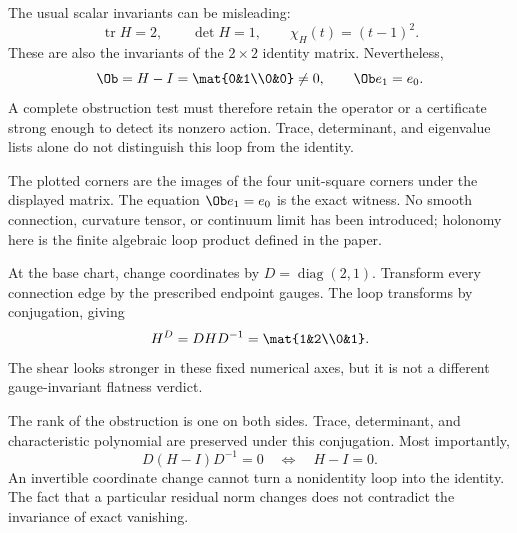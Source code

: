 
The usual scalar invariants can be misleading:
\[
\operatorname{tr}H=2,\qquad \det H=1,\qquad
\chi_H(t)=(t-1)^2.
\]
These are also the invariants of the $2\times2$ identity matrix. Nevertheless,
\[
\Ob=H-I=\mat{0&1\\0&0}\ne0,
\qquad \Ob e_1=e_0.
\]
A complete obstruction test must therefore retain the operator or a certificate strong enough to detect its nonzero action. Trace, determinant, and eigenvalue lists alone do not distinguish this loop from the identity.

The plotted corners are the images of the four unit-square corners under the displayed matrix. The equation $\Ob e_1=e_0$ is the exact witness. No smooth connection, curvature tensor, or continuum limit has been introduced; holonomy here is the finite algebraic loop product defined in the paper.


At the base chart, change coordinates by $D=\operatorname{diag}(2,1)$. Transform every connection edge by the prescribed endpoint gauges. The loop transforms by conjugation, giving
\[
H^D=DHD^{-1}=\mat{1&2\\0&1}.
\]
The shear looks stronger in these fixed numerical axes, but it is not a different gauge-invariant flatness verdict.


The rank of the obstruction is one on both sides. Trace, determinant, and characteristic polynomial are preserved under this conjugation. Most importantly,
\[
D(H-I)D^{-1}=0\quad\Longleftrightarrow\quad H-I=0.
\]
An invertible coordinate change cannot turn a nonidentity loop into the identity. The fact that a particular residual norm changes does not contradict the invariance of exact vanishing.

